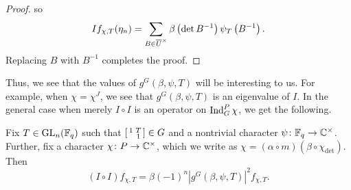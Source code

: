 \begin{proof}
    so
	\[If_{\chi,T}(\eta_n)=\sum_{B\in\overline{U}^\times}\beta\left(\det B^{-1}\right)\psi_T\left(B^{-1}\right).\]
	Replacing $B$ with $B^{-1}$ completes the proof.
\end{proof}
Thus, we see that the values of $g^G(\beta,\psi,T)$ will be interesting to us. For example, when $\chi=\chi^J$, we see that $g^G(\beta,\psi,T)$ is an eigenvalue of $I$. In the general case when merely $I\circ I$ is an operator on $\operatorname{Ind}_G^P\chi$, we get the following.
\begin{corollary}
	Fix $T\in\mathrm{GL}_n(\mathbb F_q)$ such that $\begin{bsmallmatrix}
		1 & T \\ & 1
	\end{bsmallmatrix}\in G$ and a nontrivial character $\psi\colon\mathbb F_q\to\mathbb C^\times$. Further, fix a character $\chi\colon P\to\mathbb C^\times$, which we write as $\chi=(\alpha\circ m)(\beta\circ\chi_{\det})$. Then
	\[(I\circ I)f_{\chi,T}=\beta(-1)^n\left|g^G(\beta,\psi,T)\right|^2f_{\chi,T}.\]
\end{corollary}
